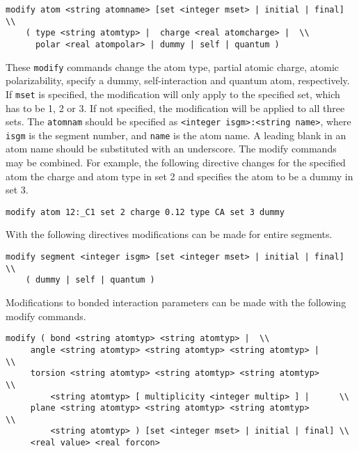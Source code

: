 \begin{verbatim}
modify atom <string atomname> [set <integer mset> | initial | final] \\
	( type <string atomtyp> |  charge <real atomcharge> |  \\
	  polar <real atompolar> | dummy | self | quantum )
\end{verbatim}

These \verb+modify+ commands change the atom type, partial atomic charge,
atomic polarizability, specify a dummy, self-interaction and quantum atom,
respectively. If \verb+mset+ is specified, the modification will only
apply to the specified set, which has to be 1, 2 or 3. If not specified,
the modification will be applied to all three sets. The \verb+atomnam+
should be specified as \verb+<integer isgm>:<string name>+, where
\verb+isgm+ is the segment number, and \verb+name+ is the atom name. A
leading blank in an atom name should be substituted with an underscore.
The modify commands may be combined. For example, the following directive
changes for the specified atom the charge and atom type in set 2 and 
specifies the atom to be a dummy in set 3.

\begin{verbatim}
modify atom 12:_C1 set 2 charge 0.12 type CA set 3 dummy
\end{verbatim}

With the following directives modifications can be made for entire
segments.

\begin{verbatim}
modify segment <integer isgm> [set <integer mset> | initial | final] \\
	( dummy | self | quantum )
\end{verbatim}

Modifications to bonded interaction parameters can be made with the
following modify commands.

\begin{verbatim}
modify ( bond <string atomtyp> <string atomtyp> |  \\
	 angle <string atomtyp> <string atomtyp> <string atomtyp> |        \\ 
 	 torsion <string atomtyp> <string atomtyp> <string atomtyp>        \\
		 <string atomtyp> [ multiplicity <integer multip> ] |      \\
	 plane <string atomtyp> <string atomtyp> <string atomtyp>          \\
		 <string atomtyp> ) [set <integer mset> | initial | final] \\
	 <real value> <real forcon>
\end{verbatim}

